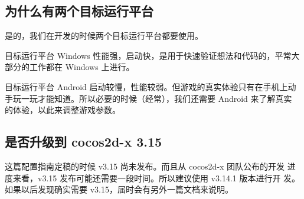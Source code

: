 \documentclass[a4paper, 10pt]{article}
\begin{document}
\subsection{为什么有两个目标运行平台}

是的，我们在开发的时候两个目标运行平台都要使用。

目标运行平台 Windows 性能强，启动快，是用于快速验证想法和代码的，平常大
部分的工作都在 Windows 上进行。

目标运行平台 Android 启动较慢，性能较弱。但游戏的真实体验只有在手机上动
手玩一玩才能知道。所以必要的时候（经常），我们还需要 Android 来了解真实
的体验，以此来调整游戏参数。

\subsection{是否升级到 cocos2d-x 3.15}

这篇配置指南定稿的时候 v3.15 尚未发布。而且从 cocos2d-x 团队公布的开发
进度来看，v3.15 发布可能还需要一段时间。所以建议使用 v3.14.1 版本进行开
发。如果以后发现确实需要 v3.15，届时会有另外一篇文档来说明。
\end{document}
